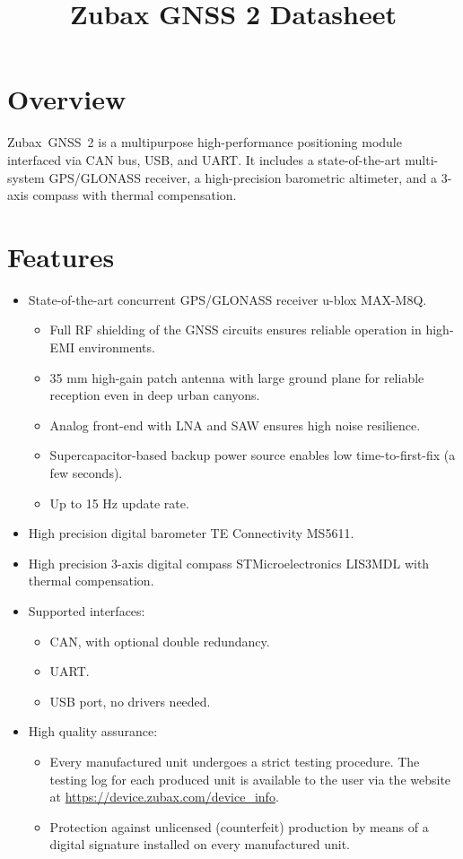\documentclass{zubaxdoc}
\title{Zubax GNSS 2 Datasheet}
\begin{document}
\frontmatter

\begin{titlepage}

\section*{Overview}

Zubax~GNSS~2 is a multipurpose high-performance positioning module interfaced via CAN bus, USB, and UART.
It includes a state-of-the-art multi-system GPS/\allowbreak{}GLONASS receiver,
a high-precision barometric altimeter, and a 3-axis compass with thermal compensation.

\section*{Features}

\begin{itemize}
    \item State-of-the-art concurrent GPS/GLONASS receiver u-blox MAX-M8Q.
    \begin{itemize}
    	\item Full RF shielding of the GNSS circuits ensures reliable operation in high-EMI environments.
    	\item 35 mm high-gain patch antenna with large ground plane for reliable reception even in deep urban canyons.
    	\item Analog front-end with LNA and SAW ensures high noise resilience.
    	\item Supercapacitor-based backup power source enables low time-to-first-fix (a few seconds).
    	\item Up to 15 Hz update rate.
    \end{itemize}
	\item High precision digital barometer TE Connectivity MS5611.
    \item High precision 3-axis digital compass STMicroelectronics LIS3MDL with thermal compensation.
	\item Supported interfaces:
    \begin{itemize}
        \item CAN, with optional double redundancy.
        \item UART.
        \item USB port, no drivers needed.
    \end{itemize}
    \item High quality assurance:
    \begin{itemize}
        \item Every manufactured unit undergoes a strict testing procedure.
        The testing log for each produced unit is available to the user via the website at
        \url{https://device.zubax.com/device_info}.
        \item Protection against unlicensed (counterfeit) production by means of a digital signature
        installed on every manufactured unit.
    \end{itemize}
\end{itemize}


\end{titlepage}
\end{document}
